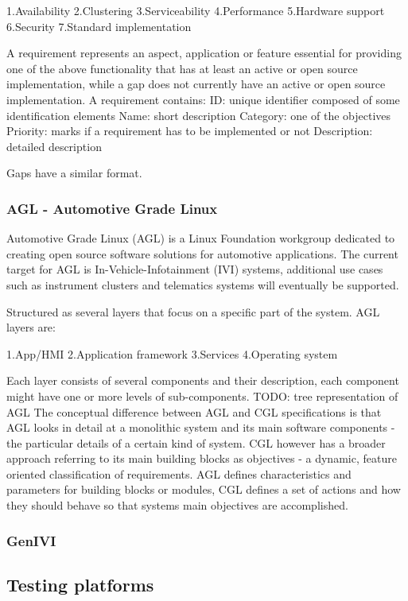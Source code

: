 \documentclass{article}
\begin{document}
			1.Availability
			2.Clustering
			3.Serviceability
			4.Performance
			5.Hardware support
			6.Security
			7.Standard implementation

			A requirement represents an aspect, application or feature essential for providing one of the above functionality that has at least an active or open source implementation, while a gap does not currently have an active or open source implementation.
			A requirement contains:
			ID: unique identifier composed of some identification elements
			Name: short description
			Category: one of the objectives
			Priority: marks if a requirement has to be implemented or not
			Description: detailed description

			Gaps have a similar format.

		\subsubsection{AGL - Automotive Grade Linux}
			Automotive Grade Linux (AGL) is a Linux Foundation workgroup dedicated to creating open source software solutions for automotive applications. The current target for AGL is In-Vehicle-Infotainment (IVI) systems, additional use cases such as instrument clusters and telematics systems will eventually be supported.

			Structured as several layers that focus on a specific part of the system. AGL layers are:

			1.App/HMI
			2.Application framework
			3.Services
			4.Operating system

		Each layer consists of several components and their description, each component might have one or more levels of sub-components.
		TODO: tree representation of AGL
		The conceptual difference between AGL and CGL specifications is that AGL looks in detail at a monolithic system and its main software components - the particular details of a certain kind of system. CGL however has a broader approach referring to its main building blocks as objectives - a dynamic, feature oriented classification of requirements. AGL defines characteristics and parameters for building blocks or modules, CGL defines a set of actions and how they should behave so that systems main objectives are accomplished.

		\subsubsection{GenIVI}

	\subsection{Testing platforms}
\end{document}
